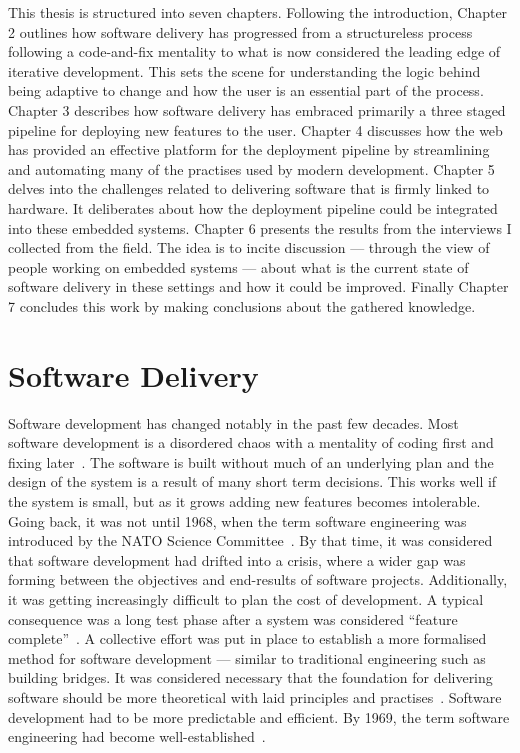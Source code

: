 \documentclass[english]{tktltiki2}
\begin{document}
This thesis is structured into seven chapters. Following the introduction, Chapter 2 outlines how software delivery has progressed from a structureless process following a code-and-fix mentality to what is now considered the leading edge of iterative development. This sets the scene for understanding the logic behind being adaptive to change and how the user is an essential part of the process. Chapter 3 describes how software delivery has embraced primarily a three staged pipeline for deploying new features to the user. Chapter 4 discusses how the web has provided an effective platform for the deployment pipeline by streamlining and automating many of the practises used by modern development. Chapter 5 delves into the challenges related to delivering software that is firmly linked to hardware. It deliberates about how the deployment pipeline could be integrated into these embedded systems. Chapter 6 presents the results from the interviews I collected from the field. The idea is to incite discussion — through the view of people working on embedded systems — about what is the current state of software delivery in these settings and how it could be improved. Finally Chapter 7 concludes this work by making conclusions about the gathered knowledge.


\section{Software Delivery}

Software development has changed notably in the past few decades. Most software development is a disordered chaos with a mentality of coding first and fixing later~\cite{Fow05}. The software is built without much of an underlying plan and the design of the system is a result of many short term decisions. This works well if the system is small, but as it grows adding new features becomes intolerable. Going back, it was not until 1968, when the term software engineering was introduced by the NATO Science Committee~\cite{NR69}. By that time, it was considered that software development had drifted into a crisis, where a wider gap was forming between the objectives and end-results of software projects. Additionally, it was getting increasingly difficult to plan the cost of development. A typical consequence was a long test phase after a system was considered “feature complete”~\cite{Fow05}. A collective effort was put in place to establish a more formalised method for software development — similar to traditional engineering such as building bridges. It was considered necessary that the foundation for delivering software should be more theoretical with laid principles and practises~\cite{NR69}. Software development had to be more predictable and efficient. By 1969, the term software engineering had become well-established~\cite{BR70}.
\end{document}
